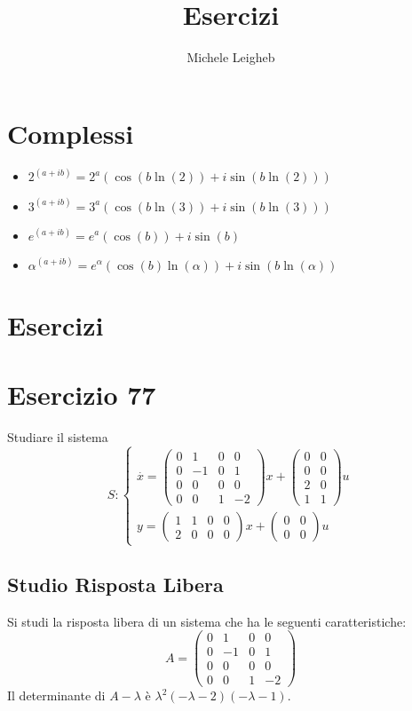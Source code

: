 \documentclass{article}
\title{Esercizi}
\author{Michele Leigheb}
\date{}
\begin{document}
\maketitle
\tableofcontents{}
\section{Complessi}
\begin{itemize}
	\item \(\displaystyle 2^{(a+ib)} = 2^a (\cos(b \ln(2)) + i\sin(b \ln(2))) \)
	\item \(\displaystyle 3^{(a+ib)} = 3^a (\cos(b \ln(3)) + i\sin(b \ln(3))) \)
	\item \(\displaystyle e^{(a+ib)} = e^a (\cos(b)) + i\sin(b) \)
	\item \(\displaystyle \alpha^{(a+ib)} = e^{\alpha} (\cos(b)\ln(\alpha)) + i\sin(b\ln(\alpha)) \)
\end{itemize}



\section{Esercizi}

\section{Esercizio 77 }
 Studiare il sistema \[S:\begin{cases}\overset{\cdot}{x} = \left(\begin{matrix}0 & 1 & 0 & 0\\0 & -1 & 0 & 1\\0 & 0 & 0 & 0\\0 & 0 & 1 & -2\end{matrix}\right) x+ \left(\begin{matrix}0 & 0\\0 & 0\\2 & 0\\1 & 1\end{matrix}\right)u\\y = \left(\begin{matrix}1 & 1 & 0 & 0\\2 & 0 & 0 & 0\end{matrix}\right) x +\left(\begin{matrix}0 & 0\\0 & 0\end{matrix}\right) u\end{cases}\]\subsection{Studio Risposta Libera}
Si studi la risposta libera di un sistema che ha le seguenti caratteristiche: \[A = \left(\begin{matrix}0 & 1 & 0 & 0\\0 & -1 & 0 & 1\\0 & 0 & 0 & 0\\0 & 0 & 1 & -2\end{matrix}\right)\]
Il determinante di $A-\lambda$ è $ \lambda^{2} \left(- \lambda - 2\right) \left(- \lambda - 1\right) $.
\end{document}

